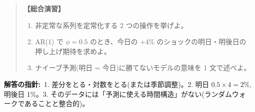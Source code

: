\documentclass{article}
\begin{document}
\begin{quote}
\textbf{【総合演習】}
\begin{enumerate}
\item 非定常な系列を定常化する 2 つの操作を挙げよ。
\item AR(1) で \(\phi = 0.5\) のとき、今日の +4\% のショックの明日・明後日の押し上げ期待を求めよ。
\item ナイーブ予測(明日 = 今日)に勝てないモデルの意味を 1 文で述べよ。
\end{enumerate}
\end{quote}

\textbf{解答の指針:}\ 1. 差分をとる・対数をとる(または季節調整)。2. 明日 \(0.5 \times 4 = 2\%\), 明後日 1\%。3. そのデータには「予測に使える時間構造」がない(ランダムウォークであることと整合的)。
\end{document}

